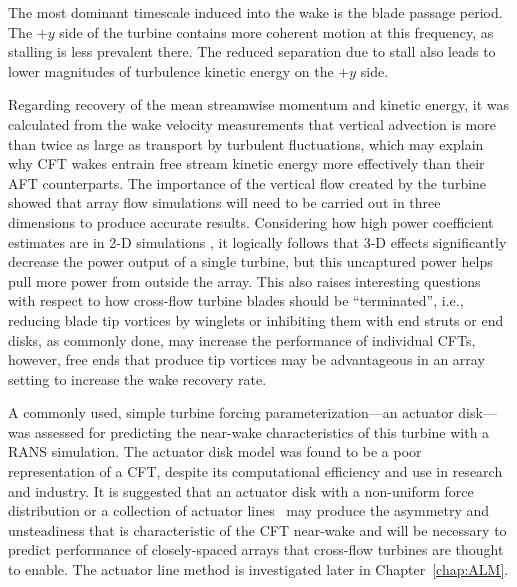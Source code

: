 The most dominant timescale induced into the wake is the blade passage period. 
The $+y$ side of the turbine contains more coherent motion at this
frequency, as stalling is less prevalent there. The reduced separation due to 
stall also leads to lower magnitudes of turbulence kinetic energy on the $+y$ 
side. 

Regarding recovery of the mean streamwise momentum and kinetic energy, it was
calculated from the wake velocity measurements that vertical advection is more
than twice as large as transport by turbulent fluctuations, which may explain
why CFT wakes entrain free stream kinetic energy more effectively than their AFT
counterparts. The importance of the vertical flow created by the turbine showed
that array flow simulations will need to be carried out in three dimensions to
produce accurate results. Considering how high power coefficient estimates are
in 2-D simulations \cite{Li2013}, it logically follows that 3-D effects
significantly decrease the power output of a single turbine, but this uncaptured
power helps pull more power from outside the array. This also raises interesting
questions with respect to how cross-flow turbine blades should be
``terminated'', i.e., reducing blade tip vortices by winglets or inhibiting them
with end struts or end disks, as commonly done, may increase the performance of
individual CFTs, however, free ends that produce tip vortices may be
advantageous in an array setting to increase the wake recovery rate.

A commonly used, simple turbine forcing parameterization---an actuator
disk---was assessed for predicting the near-wake characteristics of this turbine
with a RANS simulation. The actuator disk model was found to be a poor
representation of a CFT, despite its computational efficiency and use in
research and industry. It is suggested that an actuator disk with a non-uniform
force distribution or a collection of actuator lines~\cite{Sorensen2002,
    Shamsoddin2014} may produce the asymmetry and unsteadiness that is
characteristic of the CFT near-wake and will be necessary to predict performance
of closely-spaced arrays that cross-flow turbines are thought to enable. The
actuator line method is investigated later in Chapter~\ref{chap:ALM}.
